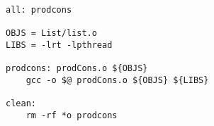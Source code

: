 \begin{lstlisting}
all: prodcons

OBJS = List/list.o
LIBS = -lrt -lpthread

prodcons: prodCons.o ${OBJS}
	gcc -o $@ prodCons.o ${OBJS} ${LIBS}
	
clean:
	rm -rf *o prodcons
\end{lstlisting}